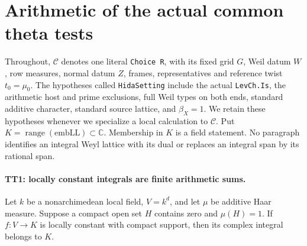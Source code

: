 \section{Arithmetic of the actual common theta tests}
\label{sec:theta-test-inputs}


Throughout, $\mathcal C$ denotes one literal \texttt{Choice R}, with
its fixed grid $G$, Weil datum $W$, row measures, normal datum $Z$,
frames, representatives and reference twist $t_0=\mu_0$. The
hypotheses called \texttt{HidaSetting} include the actual
\texttt{LevCh.Is}, the arithmetic host and prime exclusions, full
Weil types on both ends, standard additive character, standard
source lattice, and $\beta_X=1$. We retain these hypotheses whenever
we specialize a local calculation to $\mathcal C$. Put
$K=\operatorname{range}(\mathrm{embLL})\subset\mathbb C$.
Membership in $K$ is a field statement. No paragraph identifies an
integral Weyl lattice with its dual or replaces an integral span by
its rational span.

\paragraph{TT1: locally constant integrals are finite arithmetic sums.}
Let $k$ be a nonarchimedean local field, $V=k^d$, and let $\mu$ be
additive Haar measure. Suppose a compact open set $H$ contains zero
and $\mu(H)=1$. If $f:V\to K$ is locally constant with compact
support, then its complex integral belongs to $K$.

